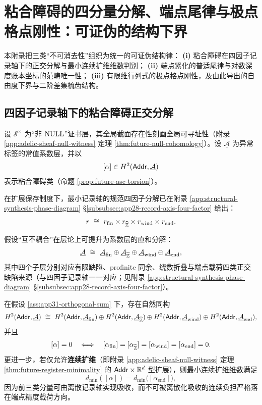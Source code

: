 \section{粘合障碍的四分量分解、端点尾律与极点格点刚性：可证伪的结构下界}\label{app:obstruction-tail-pole-rigidity}

本附录把三类“不可消去性”组织为统一的可证伪结构律：
\textbf{(i)} 粘合障碍在四因子记录轴下的正交分解与最小连续扩维维数判别；
\textbf{(ii)} 端点紧化的普适尾律与对数深度账本坐标的范畴唯一性；
\textbf{(iii)} 有限维行列式的极点格点刚性，及由此导出的自由度下界与二阶差集梳齿结构。

\subsection{四因子记录轴下的粘合障碍正交分解}\label{subsec:app31-h2-four-components}

设 $\mathcal{S}^\times$ 为“非 $\mathrm{NULL}$”证书层，其全局截面存在性刻画全局可寻址性（附录 \ref{app:adelic-sheaf-null-witness} 定理 \ref{thm:future-null-cohomology}）。设 $\underline{\mathcal{A}}$ 为异常标签的常值系数层，并以
$$
[\alpha]\in H^2(\mathsf{Addr},\underline{\mathcal{A}})
$$
表示粘合障碍类（命题 \ref{prop:future-asc-torsion}）。
\par
在扩展保存制度下，最小记录轴的规范四因子分解已在附录 \ref{app:structural-synthesis-phase-diagram} \S\ref{subsubsec:app28-record-axis-four-factor} 给出：
$$
r\ \cong\ r_{\mathrm{fin}}\times r_{\widehat{\mathbb{Z}}}\times r_{\mathrm{wind}}\times r_{\mathrm{end}}.
$$

\begin{assumption}[互不耦合与系数层直和分解]\label{ass:app31-orthogonal-sum}
假设“互不耦合”在层论上可提升为系数层的直和分解：
$$
\underline{\mathcal{A}}
\ \cong\
\underline{\mathcal{A}}_{\mathrm{fin}}
\oplus \underline{\mathcal{A}}_{\widehat{\mathbb{Z}}}
\oplus \underline{\mathcal{A}}_{\mathrm{wind}}
\oplus \underline{\mathcal{A}}_{\mathrm{end}},
$$
其中四个子层分别对应有限缺陷、profinite 同余、绕数折叠与端点载荷四类正交缺陷来源（与四因子记录轴一一对应；见附录 \ref{app:structural-synthesis-phase-diagram} \S\ref{subsubsec:app28-record-axis-four-factor}）。
\end{assumption}

\begin{theorem}[四分量障碍的正交分解]\label{thm:app31-h2-splitting}
在假设 \ref{ass:app31-orthogonal-sum} 下，存在自然同构
$$
H^2(\mathsf{Addr},\underline{\mathcal{A}})
\ \cong\
H^2(\mathsf{Addr},\underline{\mathcal{A}}_{\mathrm{fin}})
\oplus H^2(\mathsf{Addr},\underline{\mathcal{A}}_{\widehat{\mathbb{Z}}})
\oplus H^2(\mathsf{Addr},\underline{\mathcal{A}}_{\mathrm{wind}})
\oplus H^2(\mathsf{Addr},\underline{\mathcal{A}}_{\mathrm{end}}),
$$
并且
$$
[\alpha]=0
\quad\Longleftrightarrow\quad
[\alpha_{\mathrm{fin}}]=[\alpha_{\widehat{\mathbb{Z}}}]=[\alpha_{\mathrm{wind}}]=[\alpha_{\mathrm{end}}]=0.
$$
更进一步，若仅允许\textbf{连续扩维}（即附录 \ref{app:adelic-sheaf-null-witness} 定理 \ref{thm:future-register-minimality} 的 $\mathsf{Addr}\times\mathbb{R}^d$ 型扩展），则最小连续扩维维数满足
$$
d_{\min}([\alpha])=d_{\min}\!\bigl([\alpha_{\mathrm{end}}]\bigr),
$$
因为前三类分量可由离散记录轴实现吸收，而不可被离散化吸收的连续负担严格落在端点精度载荷方向。
\end{theorem}


